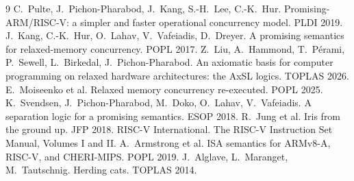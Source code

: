 \documentclass[sigplan,screen,nonacm]{acmart}
\begin{document}
\begin{thebibliography}{9}
 C.~Pulte, J.~Pichon-Pharabod, J.~Kang, S.-H.~Lee, C.-K.~Hur.
  Promising-ARM/RISC-V: a simpler and faster operational concurrency model. PLDI 2019.
 J.~Kang, C.-K.~Hur, O.~Lahav, V.~Vafeiadis, D.~Dreyer.
  A promising semantics for relaxed-memory concurrency. POPL 2017.
 Z.~Liu, A.~Hammond, T.~P\'erami, P.~Sewell, L.~Birkedal, J.~Pichon-Pharabod.
  An axiomatic basis for computer programming on relaxed hardware architectures: the AxSL logics. TOPLAS 2026.
 E.~Moiseenko et al. Relaxed memory concurrency re-executed. POPL 2025.
 K.~Svendsen, J.~Pichon-Pharabod, M.~Doko, O.~Lahav, V.~Vafeiadis.
  A separation logic for a promising semantics. ESOP 2018.
 R.~Jung et al. Iris from the ground up. JFP 2018.
 RISC-V International. The RISC-V Instruction Set Manual, Volumes I and II.
 A.~Armstrong et al. ISA semantics for ARMv8-A, RISC-V, and CHERI-MIPS. POPL 2019.
 J.~Alglave, L.~Maranget, M.~Tautschnig. Herding cats. TOPLAS 2014.
\end{thebibliography}
\end{document}
